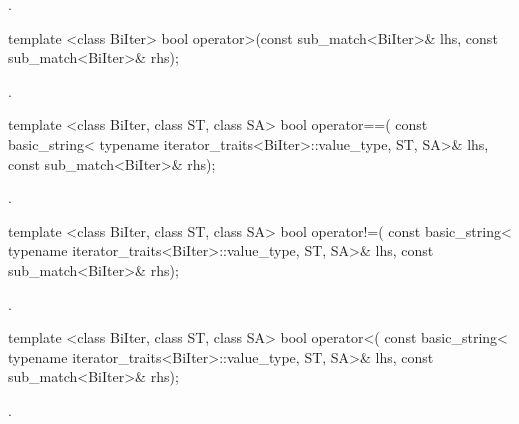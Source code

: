 \begin{itemdescr}
\pnum\returns  {}.
\end{itemdescr}

%
%
\begin{itemdecl}
template <class BiIter>
  bool operator>(const sub_match<BiIter>& lhs, const sub_match<BiIter>& rhs); 
\end{itemdecl}

\begin{itemdescr}
\pnum\returns  {}.
\end{itemdescr}

%
%
\begin{itemdecl}
template <class BiIter, class ST, class SA>
  bool operator==(
    const basic_string<
      typename iterator_traits<BiIter>::value_type, ST, SA>& lhs,
    const sub_match<BiIter>& rhs);
\end{itemdecl}

\begin{itemdescr}
\pnum\returns  {}.
\end{itemdescr}

%
%
\begin{itemdecl}
template <class BiIter, class ST, class SA>
  bool operator!=(
    const basic_string<
      typename iterator_traits<BiIter>::value_type, ST, SA>& lhs,
    const sub_match<BiIter>& rhs);
\end{itemdecl}

\begin{itemdescr}
\pnum\returns  {}.
\end{itemdescr}

%
%
\begin{itemdecl}
template <class BiIter, class ST, class SA>
  bool operator<(
    const basic_string<
      typename iterator_traits<BiIter>::value_type, ST, SA>& lhs,
    const sub_match<BiIter>& rhs);
\end{itemdecl}

\begin{itemdescr}
\pnum\returns  {}.
\end{itemdescr}


